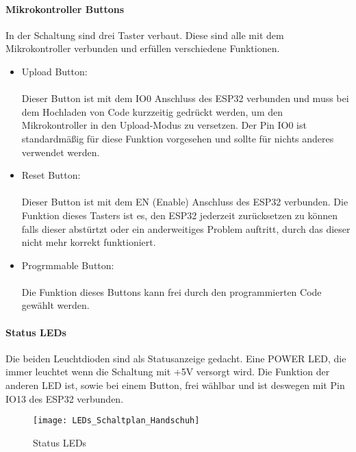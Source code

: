 \documentclass[titlepage,12pt,twoside]{article}
\begin{document}
\paragraph{Mikrokontroller Buttons}
\label{par:Mikrokontroller Buttons}
\hfill \break
\hfill \break
In der Schaltung sind drei Taster verbaut. Diese sind alle mit dem Mikrokontroller verbunden und erfüllen verschiedene Funktionen.
\begin{itemize}
	\item Upload Button: \\
		  \\ 
		  Dieser Button ist mit dem IO0 Anschluss des ESP32 verbunden und muss bei dem Hochladen von Code kurzzeitig gedrückt 
		  werden, um den Mikrokontroller in den Upload-Modus zu versetzen. Der Pin IO0 ist standardmäßig für diese Funktion vorgesehen
		  und sollte für nichts anderes verwendet werden. 
	\item Reset Button: \\
		  \\
		  Dieser Button ist mit dem EN (Enable) Anschluss des ESP32 verbunden. Die Funktion dieses Tasters ist es, den ESP32 jederzeit 
		  zurücksetzen zu können falls dieser abstürtzt oder ein anderweitiges Problem auftritt, durch das dieser nicht mehr korrekt
		  funktioniert.
	\item Progrmmable Button: \\
		  \\
		  Die Funktion dieses Buttons kann frei durch den programmierten Code gewählt werden. 
\end{itemize}

\paragraph{Status LEDs}
\hfill \break
\hfill \break
Die beiden Leuchtdioden sind als Statusanzeige gedacht. Eine POWER LED, die immer leuchtet wenn die Schaltung mit +5V
versorgt wird. Die Funktion der anderen LED ist, sowie bei einem Button, frei wählbar und ist deswegen mit Pin IO13 des ESP32
verbunden. \\
\begin{figure}[H]
	\begin{center}
		\scalebox{0.5}
		{\texttt{[image: LEDs\_Schaltplan\_Handschuh]}}
		\caption{Status LEDs}
		\label{fig:LEDs_Schaltplan_Handschuh}		
	\end{center}
\end{figure}
\end{document}
